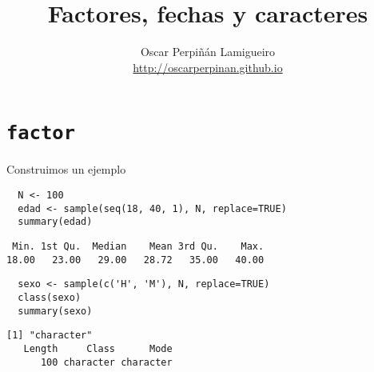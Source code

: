 \documentclass[xcolor={usenames,svgnames,dvipsnames}]{beamer}
\author{Oscar Perpiñán Lamigueiro \\ \url{http://oscarperpinan.github.io}}
\date{}
\title{Factores, fechas y caracteres}
\begin{document}
\maketitle


\section*{\texttt{factor}}
\label{sec-1}
\begin{frame}[fragile,label=sec-1-1]{Construimos un ejemplo}
 \lstset{language=R,label= ,caption= ,numbers=none}
\begin{lstlisting}
  N <- 100
  edad <- sample(seq(18, 40, 1), N, replace=TRUE)
  summary(edad)
\end{lstlisting}

\begin{verbatim}
 Min. 1st Qu.  Median    Mean 3rd Qu.    Max. 
18.00   23.00   29.00   28.72   35.00   40.00
\end{verbatim}

\lstset{language=R,label= ,caption= ,numbers=none}
\begin{lstlisting}
  sexo <- sample(c('H', 'M'), N, replace=TRUE)
  class(sexo)
  summary(sexo)
\end{lstlisting}

\begin{verbatim}
[1] "character"
   Length     Class      Mode 
      100 character character
\end{verbatim}
\end{frame}
\end{document}
